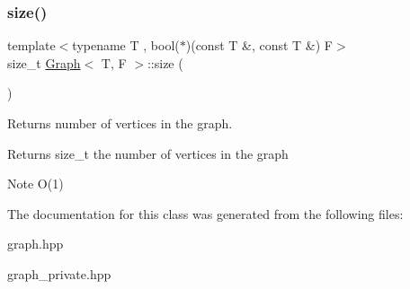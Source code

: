 \subsubsection{\texorpdfstring{size()}{size()}}
{\footnotesize\ttfamily template$<$typename T , bool($\ast$)(const T \&, const T \&) F$>$ \\
size\+\_\+t \hyperlink{class_graph}{Graph}$<$ T, F $>$\+::size (\begin{DoxyParamCaption}{ }\end{DoxyParamCaption})}



Returns number of vertices in the graph. 

\begin{DoxyReturn}{Returns}
size\+\_\+t the number of vertices in the graph
\end{DoxyReturn}
\begin{DoxyNote}{Note}
O(1) 
\end{DoxyNote}


The documentation for this class was generated from the following files\+:\begin{DoxyCompactItemize}
\item 
graph.\+hpp\item 
graph\+\_\+private.\+hpp\end{DoxyCompactItemize}
